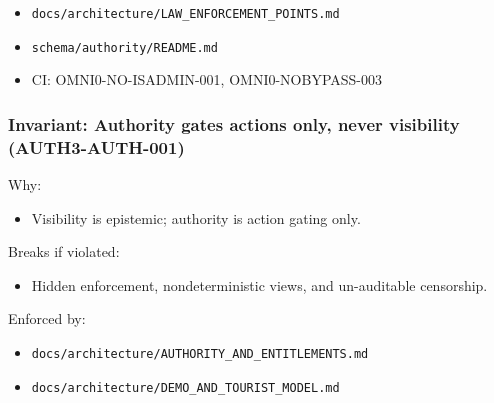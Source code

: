 \documentclass[9pt,a4paper,openany]{book}
\begin{document}
\begin{itemize}
\item \texttt{docs/\allowbreak{}architecture/\allowbreak{}LAW\_\allowbreak{}ENFORCEMENT\_\allowbreak{}POINTS.\allowbreak{}md}
\end{itemize}


\begin{itemize}
\item \texttt{schema/\allowbreak{}authority/\allowbreak{}README.\allowbreak{}md}
\end{itemize}


\begin{itemize}
\item CI: OMNI0-\allowbreak{}NO-\allowbreak{}ISADMIN-\allowbreak{}001, OMNI0-\allowbreak{}NOBYPASS-\allowbreak{}003
\end{itemize}





\subsubsection{Invariant: Authority gates actions only, never visibility (AUTH3-AUTH-001)}


Why:



\begin{itemize}
\item Visibility is epistemic; authority is action gating only.\allowbreak{}
\end{itemize}


Breaks if violated:



\begin{itemize}
\item Hidden enforcement, nondeterministic views, and un-\allowbreak{}auditable censorship.\allowbreak{}
\end{itemize}


Enforced by:



\begin{itemize}
\item \texttt{docs/\allowbreak{}architecture/\allowbreak{}AUTHORITY\_\allowbreak{}AND\_\allowbreak{}ENTITLEMENTS.\allowbreak{}md}
\end{itemize}


\begin{itemize}
\item \texttt{docs/\allowbreak{}architecture/\allowbreak{}DEMO\_\allowbreak{}AND\_\allowbreak{}TOURIST\_\allowbreak{}MODEL.\allowbreak{}md}
\end{itemize}
\end{document}
